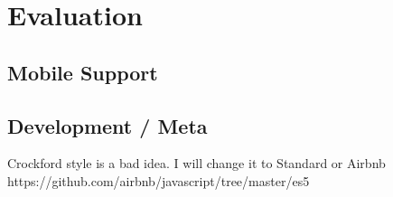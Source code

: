 \chapter{Evaluation}
\section{Mobile Support}
\section{Development / Meta}
Crockford style is a bad idea. I will change it to Standard or Airbnb https://github.com/airbnb/javascript/tree/master/es5